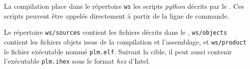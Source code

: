 La compilation place dans le répertoire \texttt{ws} les scripts \emph{python} décrits par le . Ces scripts peuvent être appelés directement à partir de la ligne de commande.


Le répertoire \texttt{ws/sources} contient les fichiers décrits dans le , \texttt{ws/objects} contient les fichiers objets issus de la compilation et l'assemblage, et \texttt{ws/product} le fichier exécutable nommé \texttt{plm.elf}. Suivant la cible, il peut aussi contenir l'exécutable \texttt{plm.ihex} sous le format \emph{hex} d'Intel.
